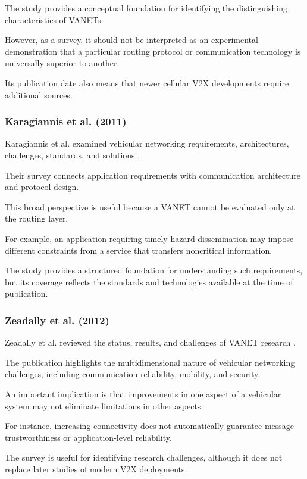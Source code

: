 The study provides a conceptual foundation
for identifying the distinguishing
characteristics of VANETs.

However, as a survey, it should not be
interpreted as an experimental demonstration
that a particular routing protocol or
communication technology is universally
superior to another.

Its publication date also means that
newer cellular V2X developments require
additional sources.

\subsubsection{Karagiannis et al. (2011)}

Karagiannis et al. examined vehicular
networking requirements, architectures,
challenges, standards, and solutions
\cite{Karagiannis2011}.

Their survey connects application
requirements with communication
architecture and protocol design.

This broad perspective is useful
because a VANET cannot be evaluated
only at the routing layer.

For example, an application requiring
timely hazard dissemination may impose
different constraints from a service
that transfers noncritical information.

The study provides a structured
foundation for understanding such
requirements, but its coverage
reflects the standards and
technologies available at the
time of publication.

\subsubsection{Zeadally et al. (2012)}

Zeadally et al. reviewed the status,
results, and challenges of VANET
research \cite{Zeadally2012}.

The publication highlights the
multidimensional nature of vehicular
networking challenges, including
communication reliability, mobility,
and security.

An important implication is that
improvements in one aspect of a
vehicular system may not eliminate
limitations in other aspects.

For instance, increasing connectivity
does not automatically guarantee
message trustworthiness or
application-level reliability.

The survey is useful for identifying
research challenges, although it
does not replace later studies
of modern V2X deployments.


